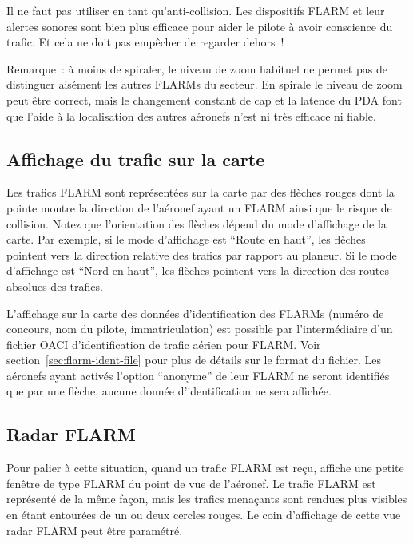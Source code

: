 \warning Il ne faut pas utiliser \xc{} en tant qu'anti-collision. Les dispositifs FLARM et leur alertes sonores sont bien plus efficace pour aider le pilote à avoir conscience du trafic. Et cela ne doit pas empêcher de regarder dehors~!

Remarque~: à moins de spiraler, le niveau de zoom habituel ne permet pas de distinguer aisément les autres FLARMs du secteur. En spirale le niveau de zoom peut être correct, mais le changement constant de cap et la latence du PDA font que l'aide à la localisation des autres aéronefs n'est ni très efficace ni fiable.


\subsection*{Affichage du trafic sur la carte}

Les trafics FLARM sont représentées sur la carte par des flèches rouges dont la pointe montre la direction de l'aéronef ayant un FLARM ainsi que le risque de collision. Notez que l'orientation des flèches dépend du mode d'affichage de la carte. Par exemple, si le mode d'affichage est ``Route en haut'', les flèches pointent vers la direction relative des trafics par rapport au planeur. Si le mode d'affichage est ``Nord en haut'', les flèches pointent vers la direction des routes absolues des trafics.

L'affichage sur la carte des données d'identification des FLARMs (numéro de concours, nom du pilote, immatriculation) est possible par l'intermédiaire d'un fichier OACI d'identification de trafic aérien pour FLARM. Voir section~\ref{sec:flarm-ident-file} pour plus de détails sur le format du fichier. Les aéronefs ayant activés l'option ``anonyme'' de leur FLARM ne seront identifiés que par une flèche, aucune donnée d'identification ne sera affichée.


\subsection*{Radar FLARM}

Pour palier à cette situation, quand un trafic FLARM est reçu, \xc{} affiche une petite fenêtre de type FLARM du point de vue de l'aéronef. Le trafic FLARM est représenté de la même façon, mais les trafics menaçants sont rendues plus visibles en étant entourées de un ou deux cercles rouges. Le coin d'affichage de cette vue radar FLARM peut être paramétré.

